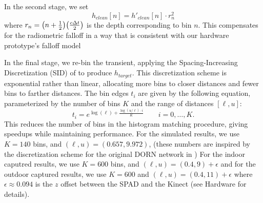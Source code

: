 In the second stage, we set 
\begin{equation}
  h_{clean}[n] = h'_{clean}[n] \cdot r_n^2
  \label{eq:h_scaled}
\end{equation}
where $r_n= \paren*{n + \frac12}\paren*{\frac{c\Delta t}{2}}$ is the depth
corresponding to bin $n$. This compensates for the radiometric falloff in a way
that is consistent with our hardware prototype's falloff model 

In the final stage, we re-bin the transient, applying the Spacing-Increasing Discretization
(SID) of \cite{Fu2018} to produce $h_{target}$. This discretization scheme is
exponential rather than linear, allocating more bins to closer distances and fewer
bins to farther distances. The bin edges $t_i$ are given by the following equation,
parameterized by the number of bins $K$ and the range of distances $[\ell, u]$: 
\begin{equation}
  t_i = e^{\log(\ell) + \frac{\log(u/\ell) \cdot i}{K}}  \qquad i = 0,\ldots, K.
  \label{eq:sid_bin_edges}
\end{equation}
This reduces the number of bins in the histogram
matching procedure, giving speedups while maintaining performance. For the
simulated results,
we use $K = 140$ bins, and $(\ell, u) = (0.657, 9.972)$, (these numbers are
inspired by the discretization scheme for the original DORN network in
\cite{Fu2018})
 For the indoor caputred results, we use $K = 600$ bins, and $(\ell, u)=(0.4, 9) + \epsilon$ 
and for the outdoor captured results, we use $K=600$ and $(\ell, u)=(0.4, 11) +
\epsilon$ where $\epsilon \approx 0.094$ is the $z$ offset between the
SPAD and the Kinect (see Hardware for details).



